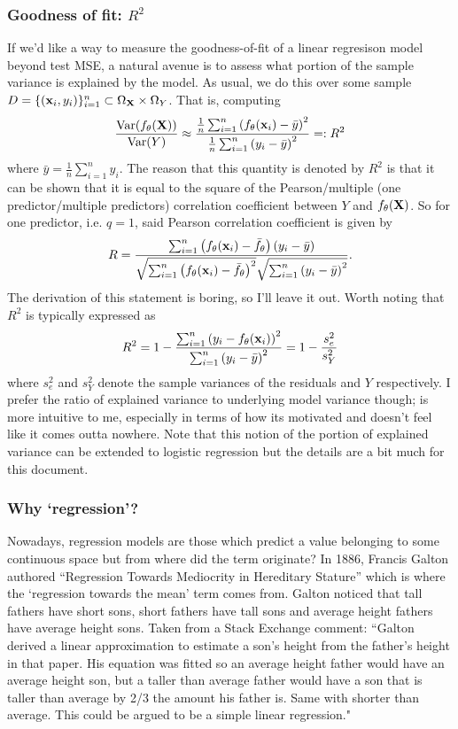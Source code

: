 \documentclass[11pt]{article}
\begin{document}
\subsubsection{Goodness of fit: $R^2$}
If we'd like a way to measure the goodness-of-fit of a linear regresison model beyond test MSE, a natural avenue is to assess what portion of the sample variance is explained by the model. As usual, we do this over some sample $D=\{(\mathbf{x}_i,y_i)\}_{i=1}^n\subset\Omega_{\mathbf{X}}\times\Omega_{Y}$. That is, computing
$$
\frac{\text{Var}(f_{\theta}(\mathbf{X}))}{\text{Var}(Y)}
\approx
\frac{\frac{1}{n}\sum_{i=1}^n\left(f_{\theta}(\mathbf{x}_i)-\bar{y}\right)^2}{\frac{1}{n}\sum_{i=1}^n\left(y_i-\bar{y}\right)^2}
=:
R^2
$$
where $\bar{y}=\frac{1}{n}\sum_{i=1}^ny_i$. The reason that this quantity is denoted by $R^2$ is that it can be shown that it is equal to the square of the Pearson/multiple (one predictor/multiple predictors) correlation coefficient between $Y$ and $f_{\theta}(\mathbf{X})$. So for one predictor, i.e. $q=1$, said Pearson correlation coefficient is given by
$$
R
=
\frac{\sum_{i=1}^n\left(f_{\theta}(\mathbf{x}_i)-\bar{f}_{\theta}\right)(y_i-\bar{y})}{\sqrt{\sum_{i=1}^n\left(f_{\theta}(\mathbf{x}_i)-\bar{f}_{\theta}\right)^2}\sqrt{\sum_{i=1}^n\left(y_i-\bar{y}\right)^2}}.
$$
The derivation of this statement is boring, so I'll leave it out. Worth noting that $R^2$ is typically expressed as
$$
R^2
=
1-\frac{\sum_{i=1}^n\left(y_i-f_{\theta}(\mathbf{x}_i)\right)^2}{\sum_{i=1}^n\left(y_i-\bar{y}\right)^2}
=
1-\frac{s_e^2}{s_Y^2}
$$
where $s_e^2$ and $s_Y^2$ denote the sample variances of the residuals and $Y$ respectively. I prefer the ratio of explained variance to underlying model variance though; is more intuitive to me, especially in terms of how its motivated and doesn't feel like it comes outta nowhere. Note that this notion of the portion of explained variance can be extended to logistic regression but the details are a bit much for this document.

\subsubsection{Why `regression'?}
Nowadays, regression models are those which predict a value belonging to some continuous space but from where did the term originate? In 1886, Francis Galton authored ``Regression Towards Mediocrity in Hereditary Stature'' which is where the `regression towards the mean' term comes from. Galton noticed that tall fathers have short sons, short fathers have tall sons and average height fathers have average height sons. Taken from a Stack Exchange comment: ``Galton derived a linear approximation to estimate a son's height from the father's height in that paper. His equation was fitted so an average height father would have an average height son, but a taller than average father would have a son that is taller than average by 2/3 the amount his father is. Same with shorter than average. This could be argued to be a simple linear regression."
\end{document}
